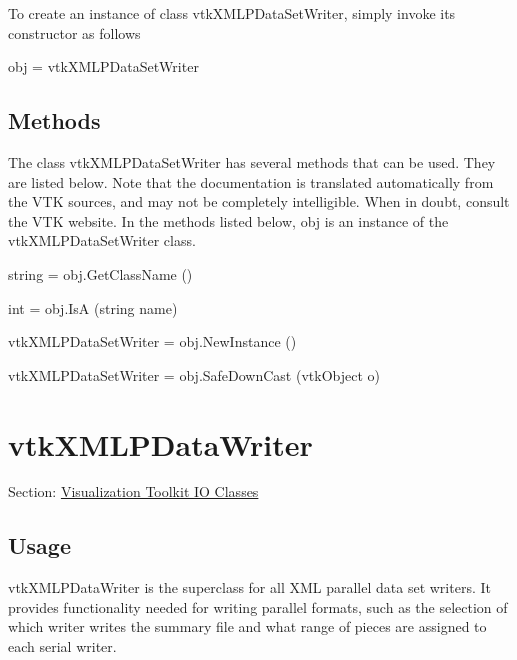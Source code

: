 To create an instance of class vtk\-X\-M\-L\-P\-Data\-Set\-Writer, simply invoke its constructor as follows \begin{DoxyVerb}  obj = vtkXMLPDataSetWriter
\end{DoxyVerb}
 \hypertarget{vtkwidgets_vtkxyplotwidget_Methods}{}\subsection{Methods}\label{vtkwidgets_vtkxyplotwidget_Methods}
The class vtk\-X\-M\-L\-P\-Data\-Set\-Writer has several methods that can be used. They are listed below. Note that the documentation is translated automatically from the V\-T\-K sources, and may not be completely intelligible. When in doubt, consult the V\-T\-K website. In the methods listed below, {\ttfamily obj} is an instance of the vtk\-X\-M\-L\-P\-Data\-Set\-Writer class. 
\begin{DoxyItemize}
\item {\ttfamily string = obj.\-Get\-Class\-Name ()}  
\item {\ttfamily int = obj.\-Is\-A (string name)}  
\item {\ttfamily vtk\-X\-M\-L\-P\-Data\-Set\-Writer = obj.\-New\-Instance ()}  
\item {\ttfamily vtk\-X\-M\-L\-P\-Data\-Set\-Writer = obj.\-Safe\-Down\-Cast (vtk\-Object o)}  
\end{DoxyItemize}\hypertarget{vtkio_vtkxmlpdatawriter}{}\section{vtk\-X\-M\-L\-P\-Data\-Writer}\label{vtkio_vtkxmlpdatawriter}
Section\-: \hyperlink{sec_vtkio}{Visualization Toolkit I\-O Classes} \hypertarget{vtkwidgets_vtkxyplotwidget_Usage}{}\subsection{Usage}\label{vtkwidgets_vtkxyplotwidget_Usage}
vtk\-X\-M\-L\-P\-Data\-Writer is the superclass for all X\-M\-L parallel data set writers. It provides functionality needed for writing parallel formats, such as the selection of which writer writes the summary file and what range of pieces are assigned to each serial writer.

